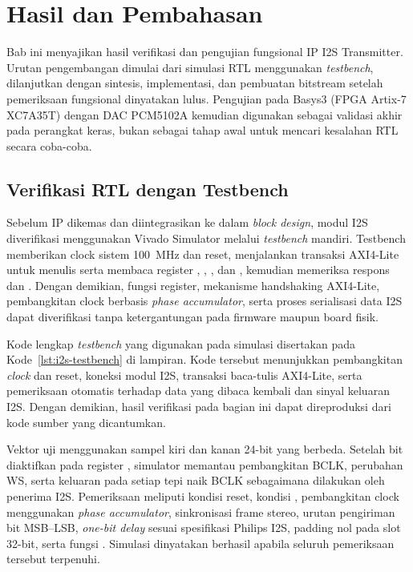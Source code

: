 \chapter{Hasil dan Pembahasan}

Bab ini menyajikan hasil verifikasi dan pengujian fungsional IP I2S Transmitter. Urutan pengembangan dimulai dari simulasi RTL menggunakan \textit{testbench}, dilanjutkan dengan sintesis, implementasi, dan pembuatan bitstream setelah pemeriksaan fungsional dinyatakan lulus. Pengujian pada Basys3 (FPGA Artix-7 XC7A35T) dengan DAC PCM5102A kemudian digunakan sebagai validasi akhir pada perangkat keras, bukan sebagai tahap awal untuk mencari kesalahan RTL secara coba-coba.

\section{Verifikasi RTL dengan Testbench}

Sebelum IP dikemas dan diintegrasikan ke dalam \textit{block design}, modul I2S diverifikasi menggunakan Vivado Simulator melalui \textit{testbench} mandiri. Testbench memberikan clock sistem 100~MHz dan reset, menjalankan transaksi AXI4-Lite untuk menulis serta membaca register , , , dan , kemudian memeriksa respons  dan . Dengan demikian, fungsi register, mekanisme handshaking AXI4-Lite, pembangkitan clock berbasis \textit{phase accumulator}, serta proses serialisasi data I2S dapat diverifikasi tanpa ketergantungan pada firmware maupun board fisik.

Kode lengkap \textit{testbench} yang digunakan pada simulasi disertakan pada Kode~\ref{lst:i2s-testbench} di lampiran. Kode tersebut menunjukkan pembangkitan \textit{clock} dan reset, koneksi modul I2S, transaksi baca-tulis AXI4-Lite, serta pemeriksaan otomatis terhadap data yang dibaca kembali dan sinyal keluaran I2S. Dengan demikian, hasil verifikasi pada bagian ini dapat direproduksi dari kode sumber yang dicantumkan.

Vektor uji menggunakan sampel kiri dan kanan 24-bit yang berbeda. Setelah bit  diaktifkan pada register , simulator memantau pembangkitan BCLK, perubahan WS, serta keluaran  pada setiap tepi naik BCLK sebagaimana dilakukan oleh penerima I2S. Pemeriksaan meliputi kondisi reset, kondisi , pembangkitan clock menggunakan \textit{phase accumulator}, sinkronisasi frame stereo, urutan pengiriman bit MSB--LSB, \textit{one-bit delay} sesuai spesifikasi Philips I2S, padding nol pada slot 32-bit, serta fungsi . Simulasi dinyatakan berhasil apabila seluruh pemeriksaan tersebut terpenuhi.

